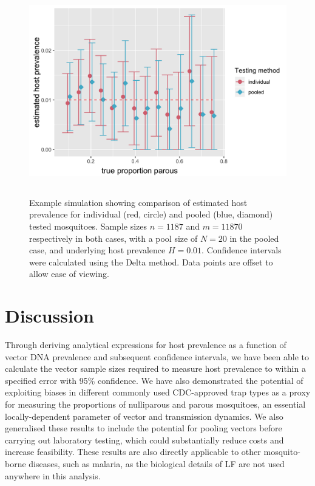 \begin{figure}[h]
\begin{center}
\includegraphics[height=9cm]{Project/Figures/Xeno/HPrevEst.png}
\end{center}
\caption{Example simulation showing comparison of estimated host prevalence for individual (red, circle) and pooled (blue, diamond) tested mosquitoes. Sample sizes $n=1187$ and $m=11870$ respectively in both cases, with a pool size of $N=20$ in the pooled case, and underlying host prevalence $H=0.01$. Confidence intervals were calculated using the Delta method. Data points are offset to allow ease of viewing.}
\label{fig:hPrev}
\end{figure}

\FloatBarrier

\section{Discussion}

Through deriving analytical expressions for host prevalence as a function of vector DNA prevalence and subsequent confidence intervals, we have been able to calculate the vector sample sizes required to measure host prevalence to within a specified error with 95\% confidence. We have also demonstrated the potential of exploiting biases in different commonly used CDC-approved trap types as a proxy for measuring the proportions of nulliparous and parous mosquitoes, an essential locally-dependent parameter of vector and transmission dynamics. We also generalised these results to include the potential for pooling vectors before carrying out laboratory testing, which could substantially reduce costs and increase feasibility. These results are also directly applicable to other mosquito-borne diseases, such as malaria, as the biological details of LF are not used anywhere in this analysis.


